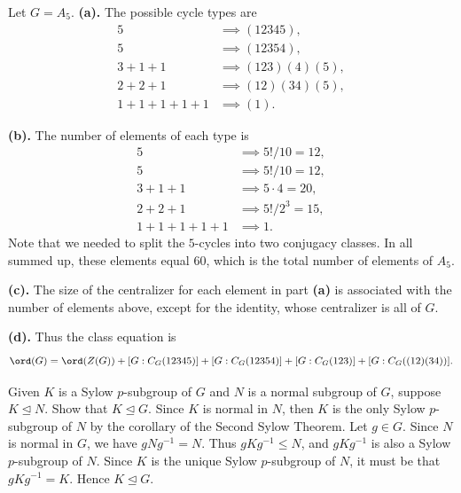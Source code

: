 \begin{problem}[Exercise 5]{
    Let $G = A_5$.
}
    \textbf{(a).}
    The possible cycle types are
    \begin{align*}
        5 &\implies (12345),\\
        5 &\implies (12354),\\
        3 + 1 + 1 &\implies (123)(4)(5),\\
        2 + 2 + 1 &\implies (12)(34)(5),\\
        1 + 1 + 1 + 1 + 1 &\implies (1).
    \end{align*}

    \textbf{(b).}
    The number of elements of each type is
    \begin{align*}
        5 &\implies 5!/10 = 12,\\
        5 &\implies 5!/10 = 12,\\
        3 + 1 + 1 &\implies 5 \cdot 4 = 20,\\
        2 + 2 + 1 &\implies 5!/2^3 = 15,\\
        1 + 1 + 1 + 1 + 1 &\implies 1.
    \end{align*}
    Note that we needed to split the $5$-cycles into two conjugacy classes.
    In all summed up, these elements equal $60$, which is the total number of elements of $A_5$.

    \textbf{(c).}
    The size of the centralizer for each element in part \textbf{(a)} is associated with the number of elements above, except for the identity, whose centralizer is all of $G$.

    \textbf{(d).}
    Thus the class equation is
    \[
        \ord(G) = \ord(Z(G)) + [G : C_G(12345)] + [G : C_G(12354)] + [G : C_G(123)] + [G : C_G((12)(34))].
    \]
\end{problem}

\begin{problem}[Exercise 6]{
    Given $K$ is a Sylow $p$-subgroup of $G$ and $N$ is a normal subgroup of $G$, suppose $K \trianglelefteq N$.
    Show that $K \trianglelefteq G$.
}
    Since $K$ is normal in $N$, then $K$ is the only Sylow $p$-subgroup of $N$ by the corollary of the Second Sylow Theorem.
    Let $g \in G$.
    Since $N$ is normal in $G$, we have $gNg^{-1} = N$.
    Thus $gKg^{-1} \leq N$, and $gKg^{-1}$ is also a Sylow $p$-subgroup of $N$.
    Since $K$ is the unique Sylow $p$-subgroup of $N$, it must be that $gKg^{-1} = K$.
    Hence $K \trianglelefteq G$.
\end{problem}

